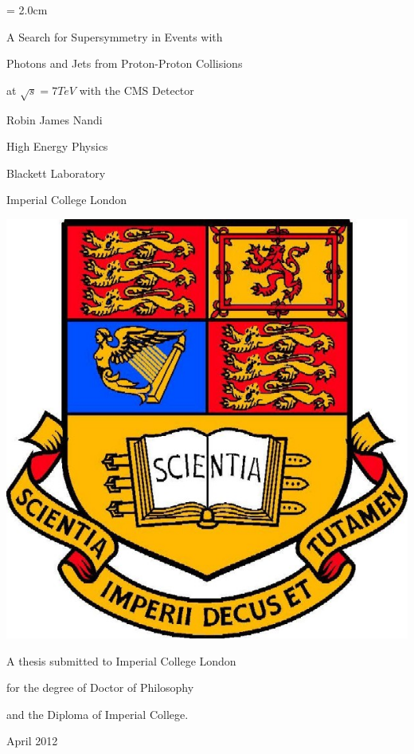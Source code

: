 \begin{titlepage}
\topmargin = 2.0cm
\begin{center}
{\bf 
\centerline{\Large A Search for Supersymmetry in Events with}
\centerline{\Large Photons and Jets from Proton-Proton Collisions}
\centerline{\Large at $\sqrt{s} = 7 \unit{TeV}$ with the CMS Detector}}
\vspace{1.3cm}
\centerline{\Large Robin James Nandi}
\vspace{0.8cm}
\centerline{\large High Energy Physics}
\centerline{\large Blackett Laboratory}
\centerline{\large Imperial College London}
\vspace{1.0cm}
\includegraphics[scale=0.3]{title/ICcrest.jpg} \\
\vspace{1.0cm}
\centerline{\large A thesis submitted to Imperial College London}
\centerline{\large for the degree of Doctor of Philosophy}
\centerline{\large and the Diploma of Imperial College.}
\vspace{0.5cm}
\centerline{\large April 2012}
\end{center}
\end{titlepage}
